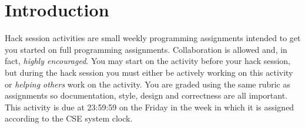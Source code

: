 \section*{Introduction}

Hack session activities are small weekly programming assignments intended
to get you started on full programming assignments.  Collaboration is allowed
and, in fact, \emph{highly encouraged}.  You may start on the activity before
your hack session, but during the hack session you must either be actively 
working on this activity or \emph{helping others} work on the activity.
You are graded using the same rubric as assignments so documentation, style, 
design and correctness are all important.  This activity is due at 23:59:59
on the Friday in the week in which it is assigned according to the CSE system
clock.


